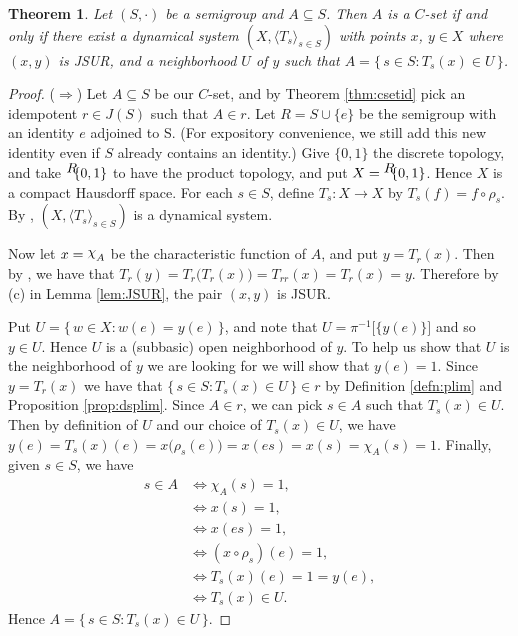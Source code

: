 \documentclass[12pt]{article}
\theoremstyle{plain}
\newtheorem{thm}{Theorem}[section]
\theoremstyle{definition}
\newcommand{\la}{\langle}
\newcommand{\ra}{\rangle}
\newcommand{\ds}{(X, \la T_s \ra_{s\in S})}
\newcommand{\setfunc}[2]{\hbox{${}^{\hbox{$#1$}}\hskip -3 pt #2$}}
\newcommand{\cchi}{\raise 2 pt \hbox{$\chi$}}
\begin{document}
  \begin{thm}
    \label{thm:dyncsets}
    Let $(S,\cdot)$ be a semigroup and $A \subseteq S$. 
    Then $A$ is a $C$-set if and only if there exist a dynamical
    system $\ds$ with points $x$, $y \in X$ where $(x,y)$ is JSUR, and
    a neighborhood $U$ of $y$ such that $A = \{\, s \in S : T_s(x) \in
    U \,\}$.
  \end{thm}
  \begin{proof}
    ($\Rightarrow$) Let $A \subseteq S$ be our $C$-set, and by
    Theorem \ref{thm:csetid} pick an idempotent $r \in J(S)$ such that
    $A \in r$. 
    Let $R = S \cup \{e\}$ be the semigroup with an identity $e$
    adjoined to S. 
    (For expository convenience, we still add this new identity even
    if $S$ already contains an identity.)
    Give $\{0,1\}$ the discrete topology, and take
    $\setfunc{R}{\{0,1\}}$ to have
    the product topology, and put $X = \setfunc{R}{\{0,1\}}$.
    Hence $X$ is a compact Hausdorff space.
    For each $s \in S$, define $T_s : X \to X$ by $T_s(f) = f \circ
    \rho_s$. 
    By \cite[Theorem 19.14]{Hindman:1998fk}, $\ds$ is a dynamical
    system. 
    
    Now let $x = \cchi_A$ be the characteristic function of $A$, and
    put $y = T_r(x)$.
    Then by \cite[Remark 19.13]{Hindman:1998fk}, we have that $T_r(y)
    = T_r\bigl(T_r(x)\bigr) = T_{rr}(x) = T_r(x) = y$.
    Therefore by (c) in Lemma \ref{lem:JSUR}, the pair $(x, y)$ is JSUR.

    Put $U = \{\, w \in X : w(e) = y(e) \,\}$, and note that $U =
    \pi^{-1}\bigl[\{y(e)\}\bigr]$ and so $y \in U$. 
    Hence $U$ is a (subbasic) open neighborhood of $y$.
    To help us show that $U$ is the neighborhood of $y$ we are looking
    for we will show that $y(e) = 1$.
    Since $y = T_r(x)$ we have that $\{\, s \in S : T_s(x) \in U \,\}
    \in r$ by Definition \ref{defn:plim} and Proposition \ref{prop:dsplim}.
    Since $A \in r$, we can pick $s \in A$ such that $T_s(x) \in U$. 
    Then by definition of $U$ and our choice of $T_s(x) \in U$, we
    have $y(e) = T_s(x)(e) = x\bigl(\rho_s(e)\bigr) = x(es) = x(s) =
    \chi_{A}(s) = 1$. 
    Finally, given $s \in S$, we have
      \begin{align*}
        s \in A &\iff \chi_{A}(s) = 1, \\
                &\iff x(s) = 1, \\
                &\iff x(es) = 1, \\
                &\iff (x \circ \rho_s)(e) = 1, \\
                &\iff T_s(x)(e) = 1 = y(e), \\
                &\iff T_s(x) \in U.
      \end{align*}
   Hence $A = \{\, s \in S : T_s(x) \in U \,\}$. 
   

\end{proof}
\end{document}
